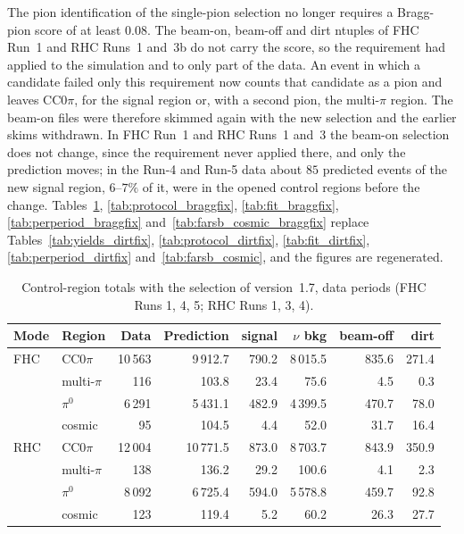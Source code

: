 \documentclass[11pt,a4paper]{article}
\begin{document}
The pion identification of the single-pion selection no longer requires a Bragg-pion score of at least $0.08$. The
beam-on, beam-off and dirt ntuples of FHC Run~1 and RHC Runs~1 and~3b do not carry the score, so the requirement had
applied to the simulation and to only part of the data. An event in which a candidate failed only this requirement now
counts that candidate as a pion and leaves CC$0\pi$, for the signal region or, with a second pion, the multi-$\pi$
region. The beam-on files were therefore skimmed again with the new selection and the earlier skims withdrawn. In FHC
Run~1 and RHC Runs~1 and~3 the beam-on selection does not change, since the requirement never applied there, and only
the prediction moves; in the Run-4 and Run-5 data about $85$ predicted events of the new signal region, $6$--$7\%$ of
it, were in the opened control regions before the change. Tables~\ref{tab:yields_braggfix}, \ref{tab:protocol_braggfix},
\ref{tab:fit_braggfix}, \ref{tab:perperiod_braggfix} and~\ref{tab:farsb_cosmic_braggfix} replace
Tables~\ref{tab:yields_dirtfix}, \ref{tab:protocol_dirtfix}, \ref{tab:fit_dirtfix}, \ref{tab:perperiod_dirtfix}
and~\ref{tab:farsb_cosmic}, and the figures are regenerated.

\begin{table}[H]
  \centering
  \caption{Control-region totals with the selection of version~1.7, data periods (FHC Runs 1, 4, 5; RHC Runs 1, 3, 4).}
  \label{tab:yields_braggfix}
  \small
  \begin{tabular}{llrrrrrr}
    \toprule
    Mode & Region & Data & Prediction & signal & $\nu$ bkg & beam-off & dirt \\
    \midrule
    FHC & CC$0\pi$    & 10\,563 & 9\,912.7 & 790.2 & 8\,015.5 & 835.6 & 271.4 \\
        & multi-$\pi$ &     116 &    103.8 &  23.4 &     75.6 &   4.5 & 0.3 \\
        & $\pi^0$     &  6\,291 & 5\,431.1 & 482.9 & 4\,399.5 & 470.7 & 78.0 \\
        & cosmic      &      95 &    104.5 &   4.4 &     52.0 &  31.7 & 16.4 \\
    \midrule
    RHC & CC$0\pi$    & 12\,004 & 10\,771.5 & 873.0 & 8\,703.7 & 843.9 & 350.9 \\
        & multi-$\pi$ &     138 &     136.2 &  29.2 &    100.6 &   4.1 & 2.3 \\
        & $\pi^0$     &  8\,092 &  6\,725.4 & 594.0 & 5\,578.8 & 459.7 & 92.8 \\
        & cosmic      &     123 &     119.4 &   5.2 &     60.2 &  26.3 & 27.7 \\
    \bottomrule
  \end{tabular}
\end{table}
\end{document}
